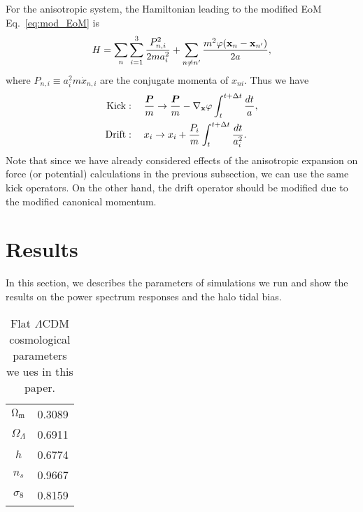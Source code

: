 \documentclass[a4paper,11pt]{article}
\newcommand{\vr}{{\bm r}}
\newcommand{\vP}{{\bm P}}
\begin{document}
For the anisotropic system,
the Hamiltonian leading to the modified EoM Eq.~\eqref{eq:mod_EoM} is
\begin{equation}
    H = \sum_n \sum_{i=1}^3 \frac{P_{n,i}^2}{2 m a_i^2}
    + \sum_{n \neq n'} \frac{m^2 \varphi({\bf x}_n - {\bf x}_{n'})}{2a},
\end{equation}
where $P_{n,i}\equiv a_i^2 m \dot x_{n,i}$ are the conjugate momenta of $x_{ni}$.
Thus we have
\begin{align}
    \mathrm{Kick} &: \quad \frac{\vP}m \to \frac{\vP}m
        - \nabla_{\bf x} \varphi \int_t^{t+\Delta t} \frac{d t}a,  \\
    \mathrm{Drift} &: \quad x_i \to x_i
        + \frac{P_i}{m} \int_t^{t+\Delta t} \frac{d t}{a_i^2}.
\end{align}
Note that since we have already considered effects of the anisotropic expansion 
on force (or potential) calculations in the previous subsection, we can use the same kick operators.
On the other hand, the drift operator should be modified due to the modified canonical momentum.





\section{Results}
\label{sec:results}
In this section, we describes the parameters of simulations we run and show the results on the power spectrum responses and the halo tidal bias.

\begin{table}[htb]
  \centering
  \begin{tabular}{|c|c|} \hline
    $\Omega_{\rm m}$ & 0.3089  \\
    $\Omega_\Lambda$ & 0.6911 \\
    $h$ & 0.6774 \\
    $n_s$ & 0.9667 \\
    $\sigma_8$ & 0.8159 \\
    \hline
  \end{tabular} 
  \caption{Flat $\Lambda$CDM cosmological parameters we ues in this paper.}
  \label{tab:cosmo_params}
\end{table}
\end{document}
